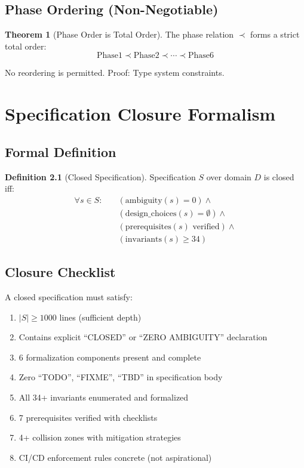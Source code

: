 \documentclass[12pt,oneside,a4paper]{book}
\theoremstyle{definition}
\newtheorem{theorem}{Theorem}[chapter]
\newtheorem{definition}{Definition}[chapter]
\begin{document}
\section{Phase Ordering (Non-Negotiable)}
\label{sec:epic9-ordering}

\begin{theorem}[Phase Order is Total Order]
The phase relation $\prec$ forms a strict total order:
$$\text{Phase1} \prec \text{Phase2} \prec \cdots \prec \text{Phase6}$$

No reordering is permitted. Proof: Type system constraints.
\end{theorem}


\chapter{Specification Closure Formalism}
\label{ch:spec-closure}


\section{Formal Definition}
\label{sec:closure-definition}

\begin{definition}[Closed Specification]
Specification $S$ over domain $D$ is closed iff:
\begin{align}
  \forall s \in S: \quad
  &(\text{ambiguity}(s) = 0) \land \\
  &(\text{design\_choices}(s) = \emptyset) \land \\
  &(\text{prerequisites}(s) \text{ verified}) \land \\
  &(\text{invariants}(s) \geq 34)
\end{align}
\end{definition}

\section{Closure Checklist}
\label{sec:closure-checklist}

A closed specification must satisfy:

\begin{enumerate}
  \item $|S| \geq 1000$ lines (sufficient depth)
  \item Contains explicit ``CLOSED'' or ``ZERO AMBIGUITY'' declaration
  \item 6 formalization components present and complete
  \item Zero ``TODO'', ``FIXME'', ``TBD'' in specification body
  \item All 34+ invariants enumerated and formalized
  \item 7 prerequisites verified with checklists
  \item 4+ collision zones with mitigation strategies
  \item CI/CD enforcement rules concrete (not aspirational)
\end{enumerate}
\end{document}
